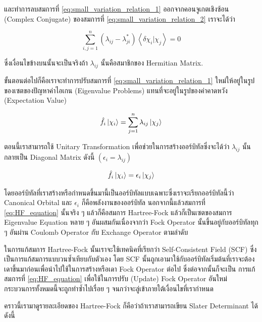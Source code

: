 \noindent และทำการลบสมการที่ \ref{eq:small_variation_relation_1} ออกจากคอนจูเกตเชิงซ้อน (Complex Conjugate) ของสมการที่
\ref{eq:small_variation_relation_2} เราจะได้ว่า

\begin{equation}
    \sum_{i, j=1}^n
        \left(\lambda_{i j}-\lambda_{j i}^*\right)
        \left\langle\delta \chi_i | \chi_j\right\rangle 
    = 0
\end{equation}

\noindent ซึ่งเงื่อนไขข้างบนนั้นจะเป็นจริงถ้า $\lambda_{i j}$ นั้นคือสมาชิกของ Hermitian Matrix. 

ขั้นตอนต่อไปก็คือเราจะทำการปรับสมการที่ \ref{eq:small_variation_relation_1} ใหม่ให้อยู่ในรูปของเซตของปัญหาค่าไอเกน
(Eigenvalue Problems) แทนที่จะอยู่ในรูปของค่าคาดหวัง (Expectation Value)

\begin{equation}
    \hat{f}_i \ket{\chi_i} = \sum_{j=1}^{n} \lambda_{i j} \ket{\chi_j}
\end{equation}

ตอนนี้เราสามารถใช้ Unitary Transformation เพื่อช่วยในการสร้างออร์บิทัลซึ่งจะได้ว่า $\lambda_{i j}$ นั้นกลายเป็น Diagonal Matrix 
ดังนี้ $(\epsilon_{i} = \lambda_{i j})$

\begin{equation}
    \label{eq:HF_equation}
    \hat{f}_i \ket{\chi_i} = \epsilon_{i} \ket{\chi_j}
\end{equation}

\noindent โดยออร์บิทัลที่เราสร้างหรือกำหนดขึ้นมานี้เป็นออร์บิทัลแบบเฉพาะซึ่งเราจะเรียกออร์บิทัลนี้ว่า Canonical Orbital และ $\epsilon_{i}$ 
ก็คือพลังงานของออร์บิทัล นอกจากนี้แล้วสมการที่ \ref{eq:HF_equation} นั้นจริง ๆ แล้วก็คือสมการ Hartree-Fock แล้วก็เป็นเซตของสมการ%
Eigenvalue Equation หลาย ๆ อันผสมกันเนื่องจากว่า Fock Operator นั้นขึ้นอยู่กับออร์บิทัลทุก ๆ อันผ่าน Coulomb Operator กับ 
Exchange Operator ตามลำดับ 

ในการแก้สมการ Hartree-Fock นั้นเราจะใช้เทคนิคที่เรียกว่า Self-Consistent Field (SCF) ซึ่งเป็นการแก้สมการแบบวนซ้ำเทียบกับตัวเอง 
โดย SCF นั้นถูกเอามาใช้กับออร์บิทัลเริ่มต้นที่เราจะต้องเดาขึ้นมาก่อนเพื่อนำไปใช้ในการสร้างหรือเดา Fock Operator ต่อไป ซึ่งต่อจากนั้นก็จะเป็น%
การแก้สมการที่ \ref{eq:HF_equation} เพื่อใช้ในการปรับ (Update) Fock Operator อันใหม่ กระบวนการทั้งหมดนี้จะถูกทำซ้ำไปเรื่อย ๆ 
จนกว่าจะลู่เข้าภายใต้เงื่อนไขที่เรากำหนด

คราวนี้เรามาดูรายละเอียดของ Hartree-Fock ก็คือว่าถ้าเราสามารถเขียน Slater Determinant ได้ดังนี้

